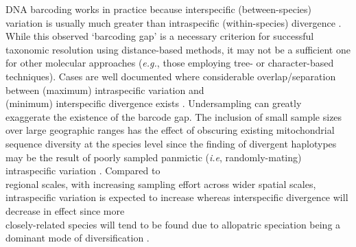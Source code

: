 DNA barcoding works in practice because interspecific (between-species) variation is usually much greater than intraspecific (within-species) divergence \cite{meyer2005dna, stoeckle2014dna}. While this observed `barcoding gap' \cite{meyer2005dna} is a necessary criterion for successful taxonomic resolution using distance-based methods, it may not be a sufficient one for other molecular approaches (\textit{e.g.}, those employing tree- or character-based techniques). Cases are well documented where considerable overlap/separation between (maximum) intraspecific variation and  \\ (minimum) interspecific divergence exists \cite{hebert2004identification, hubert2015dna}. Undersampling can greatly \\ exaggerate the existence of the barcode gap. The inclusion of small sample sizes over large geographic ranges has the effect of obscuring existing mitochondrial sequence diversity at the species level since the finding of divergent haplotypes may be the result of poorly sampled panmictic (\textit{i.e}, randomly-mating) intraspecific variation \cite{clare2011neotropical}. Compared to \\ regional scales, with increasing sampling effort across wider spatial scales, intraspecific variation is expected to increase whereas interspecific divergence will decrease in effect since more \\ closely-related species will tend to be found due to allopatric speciation being a dominant mode of diversification \cite{bergsten2012effect, pentinsaari2014barcoding}. 

\vspace{5mm}

